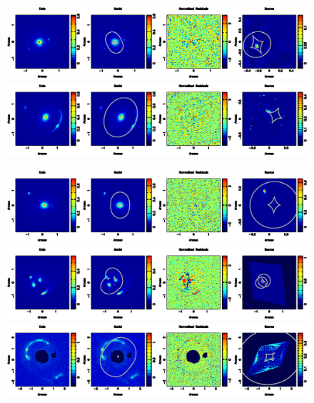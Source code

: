 \documentclass[a4paper,fleqn,usenatbib]{mnras}
\begin{document}
 \begin{figure}
\begin{center} 
\includegraphics[width = 16 cm]{fig2a.ps}
\includegraphics[width = 16 cm]{fig2b.ps}
\contcaption{}
\end{center}     
\end{figure}

 \begin{figure}
\begin{center} 
\includegraphics[width = 16 cm]{fig3a.ps}
\includegraphics[width = 16 cm]{fig3b.ps}
\includegraphics[width = 16 cm]{fig3c.ps}
\contcaption{}
\end{center}     
 \end{figure}
 
\end{document}
